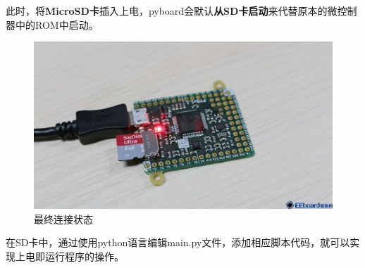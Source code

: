 \documentclass[UTF-8,12pt,a4paper]{ctexart}
\begin{document}
\begin{enumerate}[(1)]
      此时，将{\bf{MicroSD卡}}插入上电，pyboard会默认{\bf{从SD卡启动}}来代替原本的微控制器中的ROM中启动。

      \begin{figure}[H]
      \centering
      \includegraphics[width=12cm]{3_sd.jpg}
      \caption{最终连接状态}
      \label{最终连接状态}
      \end{figure}

      在SD卡中，通过使用python语言编辑main.py文件，添加相应脚本代码，就可以实现上电即运行程序的操作。
\end{enumerate}
\end{document}
